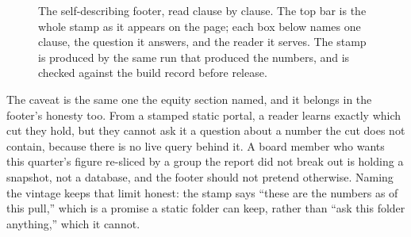 \begin{figure}[htbp]
\centering
{}
\caption[Anatomy of a self-describing footer]{The self-describing footer, read clause by clause. The top bar is the whole stamp as it appears on the page; each box below names one clause, the question it answers, and the reader it serves. The stamp is produced by the same run that produced the numbers, and is checked against the build record before release.}
\label{fig:ch12-viz-footer}
\end{figure}

The caveat is the same one the equity section named, and it belongs in the footer's honesty too. From a stamped static portal, a reader learns exactly which cut they hold, but they cannot ask it a question about a number the cut does not contain, because there is no live query behind it. A board member who wants this quarter's figure re-sliced by a group the report did not break out is holding a snapshot, not a database, and the footer should not pretend otherwise. Naming the vintage keeps that limit honest: the stamp says \enquote{these are the numbers as of this pull,} which is a promise a static folder can keep, rather than \enquote{ask this folder anything,} which it cannot.

